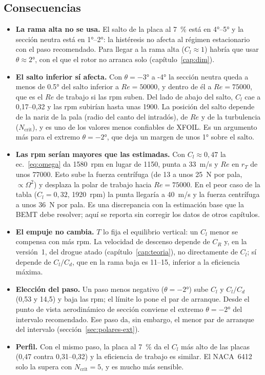 \subsection{Consecuencias}
\begin{itemize}
  \item \textbf{La rama alta no se usa.} El salto de la placa al \SI{7}{\percent} está
        en \ang{4}--\ang{5} y la sección neutra está en \ang{1}--\ang{2}: la histéresis
        no afecta al régimen estacionario con el paso recomendado. Para llegar a la rama
        alta ($C_l\approx1$) habría que usar $\theta\approx\ang{+2}$, con el que el rotor
        no arranca solo (capítulo~\ref{cap:dim}).
  \item \textbf{El salto inferior sí afecta.} Con $\theta=\ang{-3}$ a \ang{-4} la sección
        neutra queda a menos de \ang{0.5} del salto inferior a $Re=\num{50000}$, y dentro
        de él a $Re=\num{75000}$, que es el $Re$ de trabajo si las rpm suben. Del lado de
        abajo del salto, $C_l$ cae a 0,17--0,32 y las rpm subirían hasta unas \num{1900}.
        La posición del salto depende de la nariz de la pala (radio del canto del
        intradós), de $Re$ y de la turbulencia ($N_{\text{crit}}$), y es uno de los valores
        menos confiables de XFOIL. Es un argumento más para el extremo $\theta=\ang{-2}$,
        que deja un margen de unos \ang{1} sobre el salto.
  \item \textbf{Las rpm serían mayores que las estimadas.} Con $C_l\approx0{,}47$ la
        ec.~\eqref{eq:omega} da \SI{1580}{rpm} en lugar de \num{1150}, punta a
        \SI{33}{m/s} y $Re$ en $r_T$ de unos \num{77000}. Esto sube la fuerza centrífuga
        (de 13 a unos \SI{25}{N} por pala, $\propto\Omega^2$) y desplaza la polar de
        trabajo hacia $Re=\num{75000}$. En el peor caso de la tabla ($C_l=0{,}32$,
        \SI{1920}{rpm}) la punta llegaría a \SI{40}{m/s} y la fuerza centrífuga a unos
        \SI{36}{N} por pala. Es una discrepancia con la estimación base que la
        BEMT debe resolver; aquí se reporta sin corregir los datos de otros capítulos.
  \item \textbf{El empuje no cambia.} $T$ lo fija el equilibrio vertical: un $C_l$ menor
        se compensa con más rpm. La velocidad de descenso depende de $C_R$ y, en la versión~1, del drogue atado
        (capítulo~\ref{cap:teoria}), no directamente de $C_l$; sí depende de $C_l/C_d$,
        que en la rama baja es 11--15, inferior a la eficiencia máxima.
  \item \textbf{Elección del paso.} Un paso menos negativo ($\theta=\ang{-2}$) sube $C_l$
        y $C_l/C_d$ (0,53 y 14,5) y baja las rpm; el límite lo pone el par de arranque.
        Desde el punto de vista aerodinámico de sección conviene el extremo
        $\theta=\ang{-2}$ del intervalo recomendado. Ese paso da, sin embargo, el menor
        par de arranque del intervalo (sección~\ref{sec:polares-ext}).
  \item \textbf{Perfil.} Con el mismo paso, la placa al \SI{7}{\percent} da el $C_l$ más
        alto de las placas (0,47 contra 0,31--0,32) y la eficiencia de trabajo es similar.
        El NACA~6412 solo la supera con $N_{\text{crit}}=5$, y es mucho más sensible.
\end{itemize}

